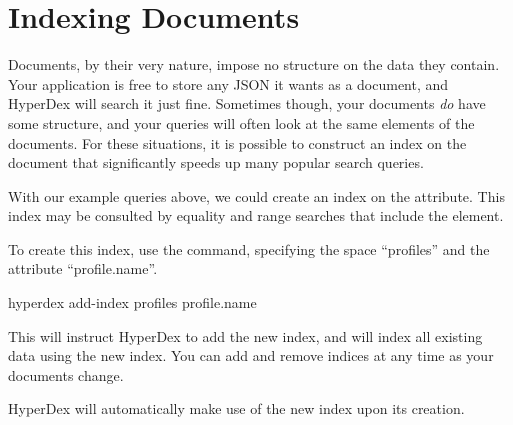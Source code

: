 \section{Indexing Documents}
\label{sec:documents:indexing}

Documents, by their very nature, impose no structure on the data they contain.
Your application is free to store any JSON it wants as a document, and HyperDex
will search it just fine.  Sometimes though, your documents {\em do} have some
structure, and your queries will often look at the same elements of the
documents.  For these situations, it is possible to construct an index on the
document that significantly speeds up many popular search queries.

With our example queries above, we could create an index on the
 attribute.  This index may be consulted by equality and
range searches that include the  element.

To create this index, use the  command, specifying the space
``profiles'' and the attribute ``profile.name''.

\begin{consolecode}
hyperdex add-index profiles profile.name
\end{consolecode}

This will instruct HyperDex to add the new index, and will index all existing
data using the new index.  You can add and remove indices at any time as your
documents change.

HyperDex will automatically make use of the new index upon its creation.
